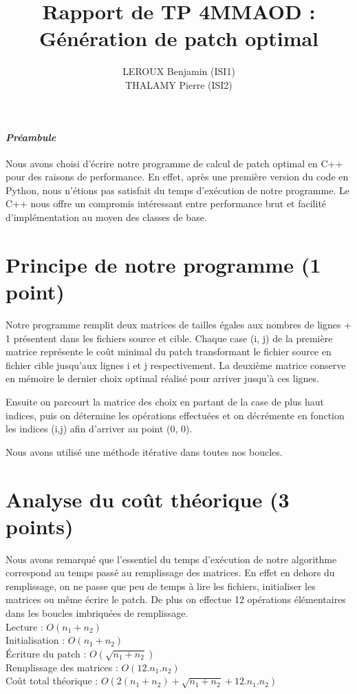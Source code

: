 \documentclass[a4paper, 10pt, french]{article}
\title{Rapport de TP 4MMAOD : Génération de patch optimal}
\author{
    LEROUX Benjamin (ISI1)
\\  THALAMY Pierre (ISI2)
}
\begin{document}
\maketitle

\paragraph{\em Préambule}
    Nous avons choisi d'écrire notre programme de calcul de patch optimal en C++ pour des raisons de performance. En effet, après une première version du code en Python, nous n'étions pas satisfait du temps d'exécution de notre programme. Le C++ nous offre un compromis intéressant entre performance brut et facilité d'implémentation au moyen des classes de base.

\section{Principe de notre  programme (1 point)}

Notre programme remplit deux matrices de tailles égales aux nombres de lignes + 1 présentent dans les fichiers source et cible. Chaque case (i, j) de la première matrice représente le coût minimal du patch transformant le fichier source en fichier cible jusqu'aux lignes i et j respectivement. La deuxième matrice conserve en mémoire le dernier choix optimal réalisé pour arriver jusqu'à ces lignes.

Ensuite on parcourt la matrice des choix en partant de la case de plus haut indices, puis on détermine les opérations effectuées et on décrémente en fonction les indices (i,j) afin d'arriver au point (0, 0).

Nous avons utilisé une méthode itérative dans toutes nos boucles.

\section{Analyse du coût théorique (3 points)}
Nous avons remarqué que l'essentiel du temps d'exécution de notre algorithme correspond au temps passé au remplissage des matrices. En effet en dehors du remplissage, on ne passe que peu de temps à lire les fichiers, initialiser les matrices ou même écrire le patch. De plus on effectue 12 opérations élémentaires dans les boucles imbriquées de remplissage.\\
Lecture : $O(n_1+n_2)$\\
Initialisation : $O(n_1+n_2)$\\
Écriture du patch : $O(\sqrt{n_1+n_2})$ \\
Remplissage des matrices : $O(12.n_1.n_2)$\\
Coût total théorique : $O(2(n_1+n_2) + \sqrt{n_1+n_2} + 12.n_1.n_2)$
\end{document}
